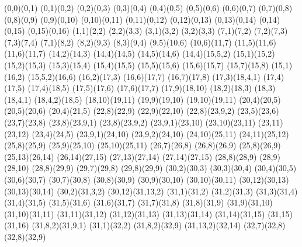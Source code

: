 \begin{sseqpage}[ classes = fill, class labels = {right = 0.02em }, xscale = 0.65, yscale=0.65, axes gap = 0.6cm ]
\structline(0,0)(0,1)
\structline(0,1)(0,2)
\structline(0,2)(0,3)
\structline(0,3)(0,4)
\structline(0,4)(0,5)
\structline(0,5)(0,6)
\structline(0,6)(0,7)
\structline(0,7)(0,8)
\structline(0,8)(0,9)
\structline(0,9)(0,10)
\structline(0,10)(0,11)
\structline(0,11)(0,12)
\structline(0,12)(0,13)
\structline(0,13)(0,14)
\structline(0,14)(0,15)
\structline(0,15)(0,16)
\structline(1,1)(2,2)
\structline(2,2)(3,3)
\structline(3,1)(3,2)
\structline(3,2)(3,3)
\structline(7,1)(7,2)
\structline(7,2)(7,3)
\structline(7,3)(7,4)
\structline(7,1)(8,2)
\structline(8,2)(9,3)
\structline(8,3)(9,4)
\structline(9,5)(10,6)
\structline(10,6)(11,7)
\structline(11,5)(11,6)
\structline(11,6)(11,7)
\structline(14,2)(14,3)
\structline(14,4)(14,5)
\structline(14,5)(14,6)
\structline(14,4)(15,5,2)
\structline(15,1)(15,2)
\structline(15,2)(15,3)
\structline(15,3)(15,4)
\structline(15,4)(15,5)
\structline(15,5)(15,6)
\structline(15,6)(15,7)
\structline(15,7)(15,8)
\structline(15,1)(16,2)
\structline(15,5,2)(16,6)
\structline(16,2)(17,3)
\structline(16,6)(17,7)
\structline(16,7)(17,8)
\structline(17,3)(18,4,1)
\structline(17,4)(17,5)
\structline(17,4)(18,5)
\structline(17,5)(17,6)
\structline(17,6)(17,7)
\structline(17,9)(18,10)
\structline(18,2)(18,3)
\structline(18,3)(18,4,1)
\structline(18,4,2)(18,5)
\structline(18,10)(19,11)
\structline(19,9)(19,10)
\structline(19,10)(19,11)
\structline(20,4)(20,5)
\structline(20,5)(20,6)
\structline(20,4)(21,5)
\structline(22,8)(22,9)
\structline(22,9)(22,10)
\structline(22,8)(23,9,2)
\structline(23,5)(23,6)
\structline(23,7)(23,8)
\structline(23,8)(23,9,1)
\structline(23,8)(23,9,2)
\structline(23,9,1)(23,10)
\structline(23,10)(23,11)
\structline(23,11)(23,12)
\structline(23,4)(24,5)
\structline(23,9,1)(24,10)
\structline(23,9,2)(24,10)
\structline(24,10)(25,11)
\structline(24,11)(25,12)
\structline(25,8)(25,9)
\structline(25,9)(25,10)
\structline(25,10)(25,11)
\structline(26,7)(26,8)
\structline(26,8)(26,9)
\structline(25,8)(26,9)
\structline(25,13)(26,14)
\structline(26,14)(27,15)
\structline(27,13)(27,14)
\structline(27,14)(27,15)
\structline(28,8)(28,9)
\structline(28,9)(28,10)
\structline(28,8)(29,9)
\structline(29,7)(29,8)
\structline(29,8)(29,9)
\structline(30,2)(30,3)
\structline(30,3)(30,4)
\structline(30,4)(30,5)
\structline(30,6)(30,7)
\structline(30,7)(30,8)
\structline(30,8)(30,9)
\structline(30,9)(30,10)
\structline(30,10)(30,11)
\structline(30,12)(30,13)
\structline(30,13)(30,14)
\structline(30,2)(31,3,2)
\structline(30,12)(31,13,2)
\structline(31,1)(31,2)
\structline(31,2)(31,3)
\structline(31,3)(31,4)
\structline(31,4)(31,5)
\structline(31,5)(31,6)
\structline(31,6)(31,7)
\structline(31,7)(31,8)
\structline(31,8)(31,9)
\structline(31,9)(31,10)
\structline(31,10)(31,11)
\structline(31,11)(31,12)
\structline(31,12)(31,13)
\structline(31,13)(31,14)
\structline(31,14)(31,15)
\structline(31,15)(31,16)
\structline(31,8,2)(31,9,1)
\structline(31,1)(32,2)
\structline(31,8,2)(32,9)
\structline(31,13,2)(32,14)
\structline(32,7)(32,8)
\structline(32,8)(32,9)


\end{sseqpage}
